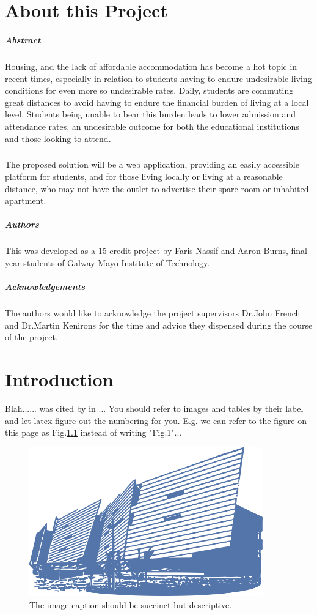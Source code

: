 \chapter*{About this Project}
\paragraph{Abstract}
Housing, and the lack of affordable accommodation has become a hot topic in recent times, especially in relation to students having to endure undesirable living conditions for even more so undesirable rates. Daily, students are commuting great distances to avoid having to endure the financial burden of living at a local level. Students being unable to bear this burden leads to lower admission and attendance rates, an undesirable outcome for both the educational institutions and those looking to attend. 

\paragraph{}
The proposed solution will be a web application, providing an easily accessible platform for students, and for those living locally or living at a reasonable distance, who may not have the outlet to advertise their spare room or inhabited apartment. 
\paragraph{Authors}
This was developed as a 15 credit project by Faris Nassif and Aaron Burns, final year students of Galway-Mayo Institute of Technology.

\paragraph{Acknowledgements}
The authors would like to acknowledge the project supervisors Dr.John French and Dr.Martin Kenirons for the time and advice they dispensed during the course of the project.

\chapter{Introduction}
Blah...... was cited by \cite{zasloff2002antimicrobial} in ... You should refer to images and tables by their label and let latex figure out the numbering for you. E.g. we can refer to the figure on this page as Fig.\ref{image:myImageName} instead of writing "Fig.1"...


\begin{figure}[h!]
	\caption{The image caption should be succinct but descriptive.}
	\label{image:myImageName}
	\centering
	\includegraphics[width=0.9\textwidth]{images/gmit-building.png}
\end{figure}	